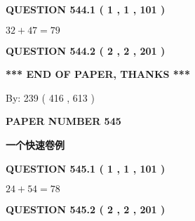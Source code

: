 \documentclass{ctexart}
\begin{document}
{\textbf{\Large{QUESTION
544.1 
 ( 1 , 1 , 101 )
}}}
  
  
 
 

$ %
32 +  %
47=   %
79$
 
 
  
\vspace{0.2in}
  
{\textbf{\Large{QUESTION
544.2 
 ( 2 , 2 , 201 )
}}}
  
  
   
   
 \vspace{0.2in}
 
   
   
   
   
\vspace{1.0in} 
{\textbf{\large{ *** END OF PAPER, THANKS *** }}} 
   
   
\hspace{1.0in} By: 
 239 ( 416 ,  613 )
   
   
   
   
\newpage 
\setcounter{page}{ 
   545001 } 
   
   
   
   
 {\textbf{ \Large{ PAPER NUMBER  545  }}}
   
   
\vspace{0.2in}
   
   
   
   
   
   
 \vspace{0.2in}
{\LARGE {\textbf{ 一个快速卷例}}}
   
   
  
\vspace{0.2in}
  
{\textbf{\Large{QUESTION
545.1 
 ( 1 , 1 , 101 )
}}}
  
  
 
 

$ %
24 +  %
54=   %
78$
 
 
  
\vspace{0.2in}
  
{\textbf{\Large{QUESTION
545.2 
 ( 2 , 2 , 201 )
}}}
  
  
   
   
 \vspace{0.2in}
 
   
   
\end{document}
